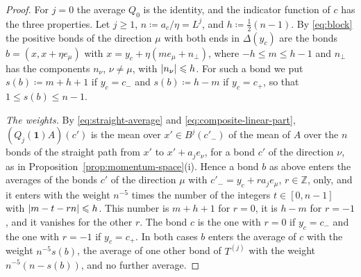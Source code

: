 \documentclass[11pt]{preprint}
\newcommand{\id}{\mathbf 1}
\DeclarePairedDelimiter{\abs}{\lvert}{\rvert}
\numberwithin{equation}{section}
\begin{document}
\begin{proof}
For $j = 0$ the average $Q_0$ is the identity, and the indicator function of $c$ has the three properties. Let $j \geqslant 1$, $n \coloneqq a_c/\eta = L^j$, and $h \coloneqq \frac{1}{2}(n - 1)$. By \eqref{eq:block} the positive bonds of the direction $\mu$ with both ends in $\Delta(y_c)$ are the bonds $b = (x, x + \eta e_\mu)$ with $x = y_c + \eta(me_\mu + n_\perp)$, where $-h \leqslant m \leqslant h - 1$ and $n_\perp$ has the components $n_\nu$, $\nu \neq \mu$, with $\abs{n_\nu} \leqslant h$. For such a bond we put $s(b) \coloneqq m + h + 1$ if $y_c = c_-$ and $s(b) \coloneqq h - m$ if $y_c = c_+$, so that $1 \leqslant s(b) \leqslant n - 1$.

\emph{The weights.} By \eqref{eq:straight-average} and \eqref{eq:composite-linear-part}, $(Q_j(\id)A)(c')$ is the mean over $x' \in B^j(c'_-)$ of the mean of $A$ over the $n$ bonds of the straight path from $x'$ to $x' + a_je_\nu$, for a bond $c'$ of the direction $\nu$, as in Proposition~\ref{prop:momentum-space}(i). Hence a bond $b$ as above enters the averages of the bonds $c'$ of the direction $\mu$ with $c'_- = y_c + ra_je_\mu$, $r \in \mathbb Z$, only, and it enters with the weight $n^{-5}$ times the number of the integers $t \in [0, n - 1]$ with $\abs{m - t - rn} \leqslant h$. This number is $m + h + 1$ for $r = 0$, it is $h - m$ for $r = -1$, and it vanishes for the other $r$. The bond $c$ is the one with $r = 0$ if $y_c = c_-$ and the one with $r = -1$ if $y_c = c_+$. In both cases $b$ enters the average of $c$ with the weight $n^{-5}s(b)$, the average of one other bond of $T^{(j)}$ with the weight $n^{-5}(n - s(b))$, and no further average.


\end{proof}
\end{document}

